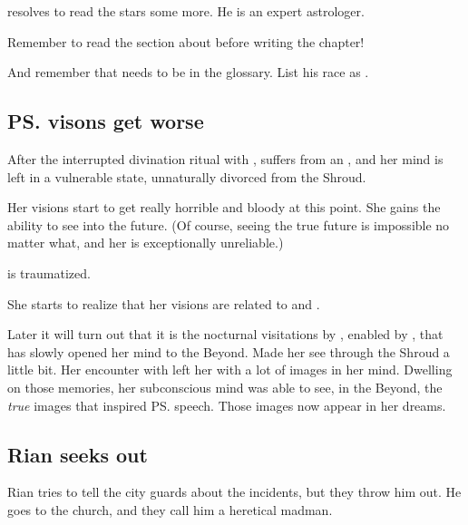 \Nasshikerr{} resolves to read the stars some more. 
He is an expert astrologer. 

Remember to read the section about  before writing the chapter!

And remember that \Nasshikerr{} needs to be in the glossary. 
List his race as \quo{\Taortha}. 











\subsection{\ps{\Tiroco} visons get worse}
After the interrupted divination ritual with \MoroCobrel, \Tiroco{} suffers from an , and her mind is left in a vulnerable state, unnaturally divorced from the Shroud. 

Her visions start to get really horrible and bloody at this point. She gains the ability to see into the future. (Of course, seeing the true future is impossible no matter what, and her  is exceptionally unreliable.)


\Tiroco{} is traumatized.

She starts to realize that her visions are related to \Icor{} and \Psyrex.

Later it will turn out that it is the nocturnal visitations by \Icor, enabled by \Psyrex, that has slowly opened her mind to the Beyond. 
Made her see through the Shroud a little bit. 
Her encounter with \Uswa{} left her with a lot of images in her mind. 
Dwelling on those memories, her subconscious mind was able to see, in the Beyond, the \emph{true} images that inspired \ps{\Uswa} speech. 
Those images now appear in her dreams. 







\subsection{Rian seeks out \Tiroco}
Rian tries to tell the city guards about the incidents, but they throw him out. He goes to the church, and they call him a heretical madman. 

